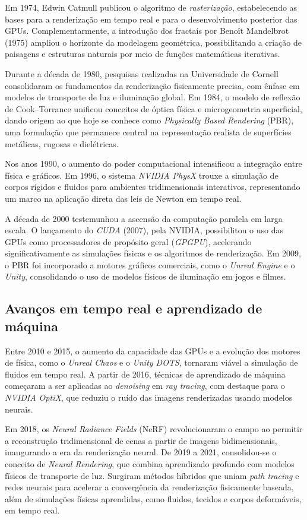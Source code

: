 {Em 1974, Edwin Catmull publicou o algoritmo de \textit{rasterização}, estabelecendo as bases para a renderização em tempo real e para o desenvolvimento posterior das GPUs. Complementarmente, a introdução dos fractais por Benoît Mandelbrot (1975) ampliou o horizonte da modelagem geométrica, possibilitando a criação de paisagens e estruturas naturais por meio de funções matemáticas iterativas.

Durante a década de 1980, pesquisas realizadas na Universidade de Cornell consolidaram os fundamentos da renderização fisicamente precisa, com ênfase em modelos de transporte de luz e iluminação global. Em 1984, o modelo de reflexão de Cook–Torrance unificou conceitos de óptica física e microgeometria superficial, dando origem ao que hoje se conhece como \textit{Physically Based Rendering} (PBR), uma formulação que permanece central na representação realista de superfícies metálicas, rugosas e dielétricas.

Nos anos 1990, o aumento do poder computacional intensificou a integração entre física e gráficos. Em 1996, o sistema \textit{NVIDIA PhysX} trouxe a simulação de corpos rígidos e fluidos para ambientes tridimensionais interativos, representando um marco na aplicação direta das leis de Newton em tempo real.

A década de 2000 testemunhou a ascensão da computação paralela em larga escala. O lançamento do \textit{CUDA} (2007), pela NVIDIA, possibilitou o uso das GPUs como processadores de propósito geral (\textit{GPGPU}), acelerando significativamente as simulações físicas e os algoritmos de renderização. Em 2009, o PBR foi incorporado a motores gráficos comerciais, como o \textit{Unreal Engine} e o \textit{Unity}, consolidando o uso de modelos físicos de iluminação em jogos e filmes.

\subsection{Avanços em tempo real e aprendizado de máquina}

Entre 2010 e 2015, o aumento da capacidade das GPUs e a evolução dos motores de física, como o \textit{Unreal Chaos} e o \textit{Unity DOTS}, tornaram viável a simulação de fluidos em tempo real. A partir de 2016, técnicas de aprendizado de máquina começaram a ser aplicadas ao \textit{denoising} em \textit{ray tracing}, com destaque para o \textit{NVIDIA OptiX}, que reduziu o ruído das imagens renderizadas usando modelos neurais.

Em 2018, os \textit{Neural Radiance Fields} (NeRF) revolucionaram o campo ao permitir a reconstrução tridimensional de cenas a partir de imagens bidimensionais, inaugurando a era da renderização neural. De 2019 a 2021, consolidou-se o conceito de \textit{Neural Rendering}, que combina aprendizado profundo com modelos físicos de transporte de luz. Surgiram métodos híbridos que uniam \textit{path tracing} e redes neurais para acelerar a convergência da renderização fisicamente baseada, além de simulações físicas aprendidas, como fluidos, tecidos e corpos deformáveis,	 em tempo real.

}
